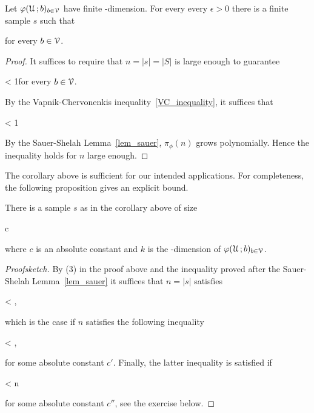 \documentclass[scombinatorics.tex]{subfiles}
\begin{document}
\begin{corollary}
  Let $\varphi(\EuScript U\,;b)_{b\in\EuScript V}$ have finite \vc-dimension. 
  For every every $\epsilon>0$ there is a finite sample $s$ such that

  \hfill for every $b\in\EuScript V$.
\end{corollary}
\begin{proof}
  It suffices to require that $n=|s|=|S|$ is large enough to guarantee 
  
  {<}
  {1}\hfill for every $b\in\EuScript V$.

  By the Vapnik-Chervonenkis inequality~\ref{VC_inequality}, it suffices that

  {<}
  {1}

  By the Sauer-Shelah Lemma~\ref{lem_sauer}, $\pi_\phi(n)$ grows polynomially.
  Hence the inequality holds for $n$ large enough.
\end{proof}

The corollary above is sufficient for our intended applications.
For completeness, the following proposition gives an explicit bound.

\begin{proposition}\label{prop_vc_sample}
  There is a sample $s$ as in the corollary above of size
  
  {\le}
  {c\,\log{}}
  
  where $c$ is an absolute constant and $k$ is the \vc-dimension of $\varphi(\EuScript U\,;b)_{b\in\EuScript V}$.
\end{proposition}

\begin{proof}[Proofsketch]
  By (3) in the proof above and the inequality proved after the Sauer-Shelah Lemma~\ref{lem_sauer} it suffices that $n=|s|$ satisfies
  
  {<}
  {,}
  
  which is the case if $n$ satisfies the following inequality 

  {<}
  {,}

  for some absolute constant $c'$.
  Finally, the latter inequality is satisfied if 

  {<}
  {n}

  for some absolute constant $c''$, see the exercise below.
\end{proof}
\end{document}
